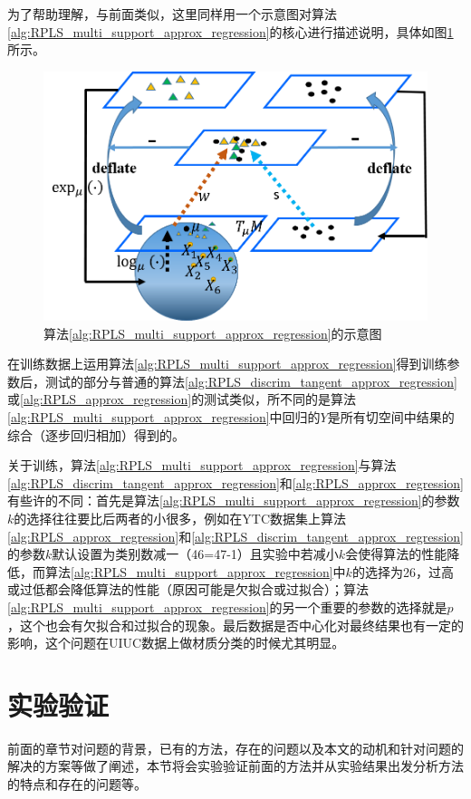为了帮助理解，与前面类似，这里同样用一个示意图对算法\ref{alg:RPLS_multi_support_approx_regression}的核心进行描述说明，具体如图\ref{fig:multi_discrim_tangent_PLS}所示。
\begin{figure}[bht]
	\centering
	\includegraphics[width=0.7\linewidth]{source/multi_discrim_tangent_PLS.png}
	\caption{算法\ref{alg:RPLS_multi_support_approx_regression}的示意图}
	\label{fig:multi_discrim_tangent_PLS}
\end{figure}

在训练数据上运用算法\ref{alg:RPLS_multi_support_approx_regression}得到训练参数后，测试的部分与普通的算法\ref{alg:RPLS_discrim_tangent_approx_regression}或\ref{alg:RPLS_approx_regression}的测试类似，所不同的是算法\ref{alg:RPLS_multi_support_approx_regression}中回归的$Y$是所有切空间中结果的综合（逐步回归相加）得到的。

关于训练，算法\ref{alg:RPLS_multi_support_approx_regression}与算法\ref{alg:RPLS_discrim_tangent_approx_regression}和\ref{alg:RPLS_approx_regression}有些许的不同：首先是算法\ref{alg:RPLS_multi_support_approx_regression}的参数$k$的选择往往要比后两者的小很多，例如在YTC\cite{Database_YTC}数据集上算法\ref{alg:RPLS_approx_regression}和\ref{alg:RPLS_discrim_tangent_approx_regression}的参数$k$默认设置为类别数减一（46=47-1）且实验中若减小$k$会使得算法的性能降低，而算法\ref{alg:RPLS_multi_support_approx_regression}中$k$的选择为26，过高或过低都会降低算法的性能（原因可能是欠拟合或过拟合）；算法\ref{alg:RPLS_multi_support_approx_regression}的另一个重要的参数的选择就是$p$，这个也会有欠拟合和过拟合的现象。最后数据是否中心化对最终结果也有一定的影响，这个问题在UIUC\cite{Database_UIUC}数据上做材质分类的时候尤其明显。
\section{实验验证}
\label{sec:RPLS_exp}
前面的章节对问题的背景，已有的方法，存在的问题以及本文的动机和针对问题的解决的方案等做了阐述，本节将会实验验证前面的方法并从实验结果出发分析方法的特点和存在的问题等。

